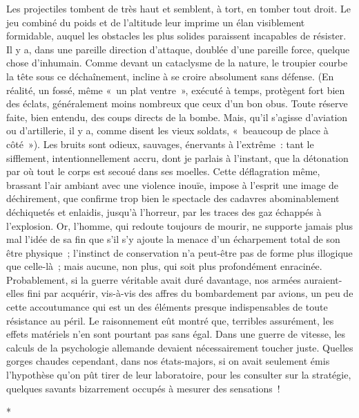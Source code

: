 \documentclass[french,twoside]{book} %
\begin{document}
Les projectiles tombent de très haut et semblent, à tort, en tomber tout droit. Le jeu combiné du poids et de l’altitude leur imprime un élan visiblement formidable, auquel les obstacles les plus solides paraissent incapables de résister. Il y a, dans une pareille direction d’attaque, doublée d’une pareille force, quelque chose d’inhumain. Comme devant un cataclysme de la nature, le troupier courbe la tête sous ce déchaînement, incline à se croire absolument sans défense. (En réalité, un fossé, même « un plat ventre », exécuté à temps, protègent fort bien des éclats, généralement moins nombreux que ceux d’un bon obus. Toute réserve faite, bien entendu, des coups directs de la bombe. Mais, qu’il s’agisse d’aviation ou d’artillerie, il y a, comme disent les vieux soldats, « beaucoup de place à côté »). Les bruits sont odieux, sauvages, énervants à l’extrême : tant le sifflement, intentionnellement accru, dont je parlais à l’instant, que la détonation par où tout le corps est secoué dans ses moelles. Cette déflagration même, brassant l’air ambiant avec une violence inouïe, impose à l’esprit une image de déchirement, que confirme trop bien le spectacle des cadavres abominablement déchiquetés et enlaidis, jusqu’à l’horreur, par les traces des gaz échappés à l’explosion. Or, l’homme, qui redoute toujours de mourir, ne supporte jamais plus mal l’idée de sa fin que s’il s’y ajoute la menace d’un écharpement total de son être physique ; l’instinct de conservation n’a peut-être pas de forme plus illogique que celle-là ; mais aucune, non plus, qui soit plus profondément enracinée. Probablement, si la guerre véritable avait duré davantage, nos armées auraient-elles fini par acquérir, vis-à-vis des affres du bombardement par avions, un peu de cette accoutumance qui est un   des éléments presque indispensables de toute résistance au péril. Le raisonnement eût montré que, terribles assurément, les effets matériels n’en sont pourtant pas sans égal. Dans une guerre de vitesse, les calculs de la psychologie allemande devaient nécessairement toucher juste. Quelles gorges chaudes cependant, dans nos états-majors, si on avait seulement émis l’hypothèse qu’on pût tirer de leur laboratoire, pour les consulter sur la stratégie, quelques savants bizarrement occupés à mesurer des sensations !\par

\begin{center}
\noindent \centerline{*}\par
\end{center}
\end{document}
